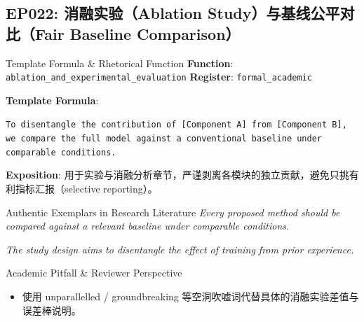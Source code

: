 \subsection{EP022: 消融实验（Ablation Study）与基线公平对比（Fair Baseline Comparison）}\label{sec:ep:EP022}
\begin{ConceptBox}{Template Formula \& Rhetorical Function}
\textbf{Function}: \texttt{ablation\_and\_experimental\_evaluation} \quad \textbf{Register}: \texttt{formal\_academic}\par\vspace{3pt}
\textbf{Template Formula}:\par\noindent\texttt{To disentangle the contribution of [Component A] from [Component B], we compare the full model against a conventional baseline under comparable conditions.}\par\vspace{4pt}
\textbf{Exposition}: 用于实验与消融分析章节，严谨剥离各模块的独立贡献，避免只挑有利指标汇报（selective reporting）。
\end{ConceptBox}
\begin{ExampleBox}{Authentic Exemplars in Research Literature}
\textit{Every proposed method should be compared against a relevant baseline under comparable conditions.}\par\vspace{2pt}
\textit{The study design aims to disentangle the effect of training from prior experience.}\par\vspace{2pt}
\end{ExampleBox}
\begin{TipBox}{Academic Pitfall \& Reviewer Perspective}
\begin{itemize}[leftmargin=1.5em, itemsep=1pt]
  \item 使用 unparallelled / groundbreaking 等空洞吹嘘词代替具体的消融实验差值与误差棒说明。
\end{itemize}
\end{TipBox}
\vspace{6pt}
